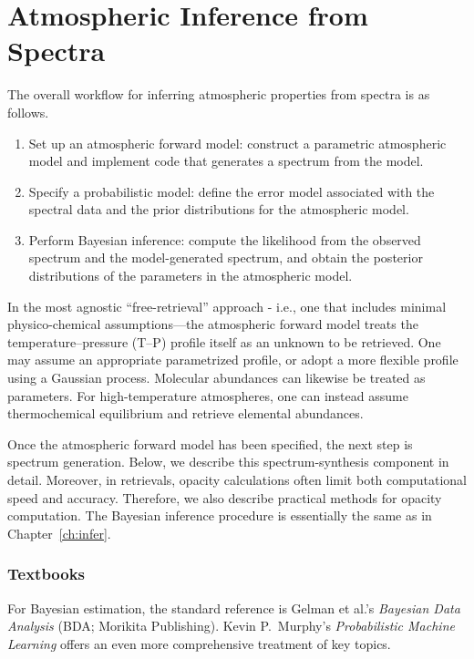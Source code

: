 \documentclass[a4paper,twocolumn]{report}
\begin{document}
\chapter{Atmospheric Inference from Spectra}

The overall workflow for inferring atmospheric properties from spectra is as follows.
\begin{enumerate}
    \item Set up an atmospheric forward model: construct a parametric atmospheric model and implement code that generates a spectrum from the model.
    \item Specify a probabilistic model: define the error model associated with the spectral data and the prior distributions for the atmospheric model.
    \item Perform Bayesian inference: compute the likelihood from the observed spectrum and the model-generated spectrum, and obtain the posterior distributions of the parameters in the atmospheric model.
\end{enumerate}

In the most agnostic ``free-retrieval'' approach - i.e., one that includes minimal physico-chemical assumptions—the atmospheric forward model treats the temperature–pressure (T–P) profile itself as an unknown to be retrieved. One may assume an appropriate parametrized profile, or adopt a more flexible profile using a Gaussian process. Molecular abundances can likewise be treated as parameters. For high-temperature atmospheres, one can instead assume thermochemical equilibrium and retrieve elemental abundances.

Once the atmospheric forward model has been specified, the next step is spectrum generation. Below, we describe this spectrum-synthesis component in detail. 
Moreover, in retrievals, opacity calculations often limit both computational speed and accuracy.  
Therefore, we also describe practical methods for opacity computation.
The Bayesian inference procedure is essentially the same as in Chapter~\ref{ch:infer}.










%
%

\footnotesize
{}

\subsection*{Textbooks}

For Bayesian estimation, the standard reference is Gelman et al.'s \textit{Bayesian Data Analysis} (BDA; Morikita Publishing). Kevin P.~Murphy's \textit{Probabilistic Machine Learning} offers an even more comprehensive treatment of key topics.



\end{document}
